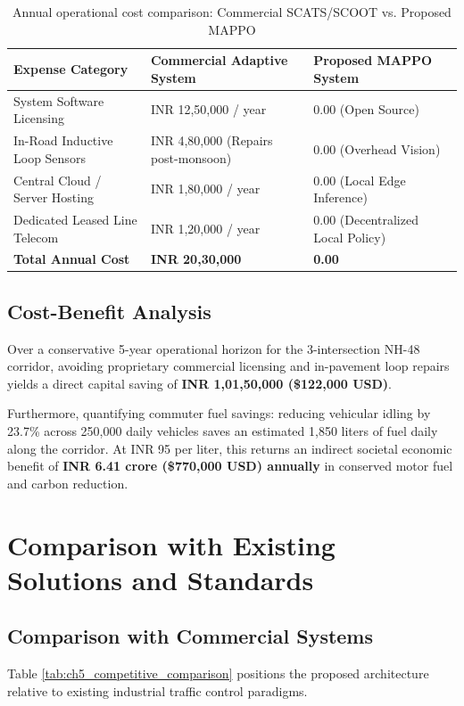 \documentclass[12pt,a4paper,oneside]{report}
\begin{document}
\begin{table}[htbp]
\centering
\small
\caption{Annual operational cost comparison: Commercial SCATS/SCOOT vs. Proposed MAPPO}
\label{tab:ch5_cost_comp}
\begin{tabularx}{\textwidth}{|p{5.5cm}|p{4.5cm}|X|}
\hline
\textbf{Expense Category} & \textbf{Commercial Adaptive System} & \textbf{Proposed MAPPO System} \\ \hline
System Software Licensing & INR 12,50,000 / year & 0.00 (Open Source) \\ \hline
In-Road Inductive Loop Sensors & INR 4,80,000 (Repairs post-monsoon) & 0.00 (Overhead Vision) \\ \hline
Central Cloud / Server Hosting & INR 1,80,000 / year & 0.00 (Local Edge Inference) \\ \hline
Dedicated Leased Line Telecom & INR 1,20,000 / year & 0.00 (Decentralized Local Policy) \\ \hline
\textbf{Total Annual Cost} & \textbf{INR 20,30,000} & \textbf{0.00} \\ \hline
\end{tabularx}
\end{table}

\subsection{Cost-Benefit Analysis}
Over a conservative 5-year operational horizon for the 3-intersection NH-48 corridor, avoiding proprietary commercial licensing and in-pavement loop repairs yields a direct capital saving of \textbf{INR 1,01,50,000 (\$122,000 USD)}.

Furthermore, quantifying commuter fuel savings: reducing vehicular idling by 23.7\% across 250,000 daily vehicles saves an estimated 1,850 liters of fuel daily along the corridor. At INR 95 per liter, this returns an indirect societal economic benefit of \textbf{INR 6.41 crore (\$770,000 USD) annually} in conserved motor fuel and carbon reduction.

\section{Comparison with Existing Solutions and Standards}
\label{sec:ch5_comparative_position}

\subsection{Comparison with Commercial Systems}
Table \ref{tab:ch5_competitive_comparison} positions the proposed architecture relative to existing industrial traffic control paradigms.
\end{document}
